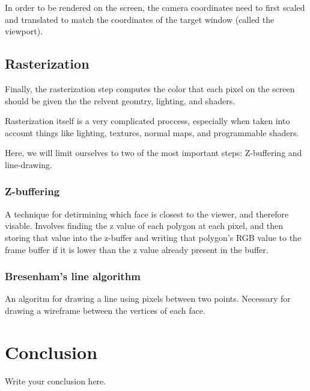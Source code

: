 \documentclass{article}
\begin{document}
In order to be rendered on the screen, the camera coordinates need to first scaled and translated to match the coordinates of the target window (called the viewport).

\subsection{Rasterization}
Finally, the rasterization step computes the color that each pixel on the screen should be given the the relvent geomtry, lighting, and shaders.

Rasterization itself is a very complicated proccess, especially when taken into account things like lighting, textures, normal maps, and programmable shaders.

Here, we will limit ourselves to two of the most important steps: Z-buffering and line-drawing.

\subsubsection{Z-buffering}
A technique for detirmining which face is closest to the viewer, and therefore visable. Involves finding the z value of each polygon at each pixel, and then storing that value into the z-buffer and writing that polygon's RGB value to the frame buffer if it is lower than the z value already present in the buffer.

\subsubsection{Bresenham's line algorithm}
An algoritm for drawing a line using pixels between two points. Necessary for drawing a wireframe between the vertices of each face.

\section{Conclusion}
Write your conclusion here.
\end{document}
